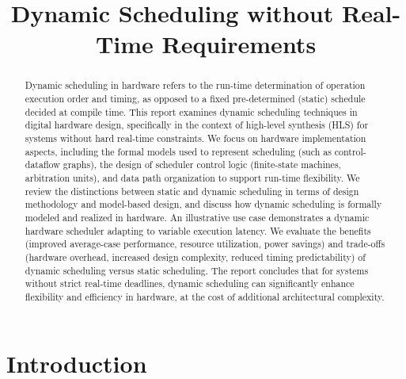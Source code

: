 \documentclass[conference]{IEEEtran}
\begin{document}
\title{ Dynamic Scheduling without Real-Time Requirements\\

}

\author{

}
\maketitle


\begin{abstract}
Dynamic scheduling in hardware refers to the run-time determination of operation execution order and timing, as opposed to a fixed pre-determined (static) schedule decided at compile time. This report examines dynamic scheduling techniques in digital hardware design, specifically in the context of high-level synthesis (HLS) for systems without hard real-time constraints. We focus on hardware implementation aspects, including the formal models used to represent scheduling (such as control-dataflow graphs), the design of scheduler control logic (finite-state machines, arbitration units), and data path organization to support run-time flexibility. We review the distinctions between static and dynamic scheduling in terms of design methodology and model-based design, and discuss how dynamic scheduling is formally modeled and realized in hardware. An illustrative use case demonstrates a dynamic hardware scheduler adapting to variable execution latency. We evaluate the benefits (improved average-case performance, resource utilization, power savings) and trade-offs (hardware overhead, increased design complexity, reduced timing predictability) of dynamic scheduling versus static scheduling. The report concludes that for systems without strict real-time deadlines, dynamic scheduling can significantly enhance flexibility and efficiency in hardware, at the cost of additional architectural complexity.\cite{Ha2017,DeMicheli1994,Rettberg2006}
\end{abstract}

\section{Introduction}
\end{document}
